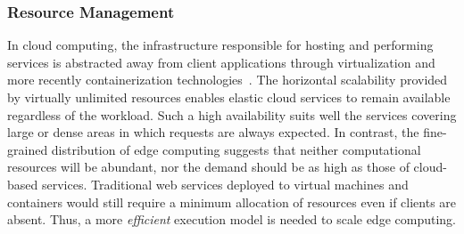 

\subsubsection*{Resource Management}\label{sec:efficiency}


In cloud computing, the infrastructure responsible for hosting and performing services is abstracted away from client applications through virtualization and more recently containerization technologies~\cite{leitner2016patterns, Quatrocchi2016discrete}. The horizontal scalability provided by virtually unlimited resources enables elastic cloud services to remain available regardless of the workload.
Such a high availability suits well the services covering large or dense areas in which requests are always expected. In contrast, the fine-grained distribution of edge computing suggests that neither computational resources will be abundant, nor the demand should be as high as those of cloud-based services. Traditional web services deployed to virtual machines and containers would still require a minimum allocation of resources even if clients are absent. Thus, a more \textit{efficient} execution model is needed to scale edge computing.


